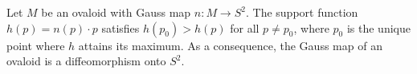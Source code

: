 Let $M$ be an ovaloid with Gauss map $n: M \to S^2$. The support function $h(p) = n(p) \cdot p$ satisfies $h(p_0) > h(p)$ for all $p \neq p_0$, where $p_0$ is the unique point where $h$ attains its maximum. As a consequence, the Gauss map of an ovaloid is a diffeomorphism onto $S^2$.